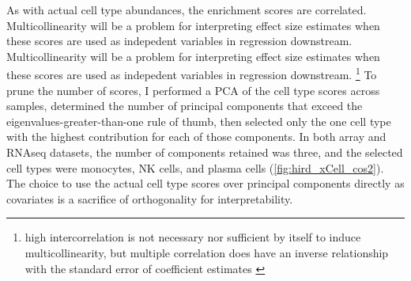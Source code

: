 As with actual cell type abundances, the enrichment scores are correlated.
Multicollinearity will be a problem for interpreting effect size estimates when these scores are used as indepedent variables in regression downstream.
Multicollinearity will be a problem for interpreting effect size estimates when these scores are used as indepedent variables in regression downstream.
\footnote{high intercorrelation is not necessary nor sufficient by itself to induce multicollinearity, but multiple correlation does have an inverse relationship with the standard error of coefficient estimates \autocite{maddala1992IntroductionEconometrics}}
To prune the number of scores, I performed a \gls{PCA} of the cell type scores across samples,
determined the number of principal components that exceed the eigenvalues-greater-than-one rule of thumb\autocite{kanyongo2005InfluenceReliabilityFour},
then selected only the one cell type with the highest contribution for each of those components.
In both array and \gls{RNAseq} datasets, the number of components retained was three, and the selected cell types were monocytes, \gls{NK} cells, and plasma cells (\cref{fig:hird_xCell_cos2}).
The choice to use the actual cell type scores over principal components directly as covariates is a sacrifice of orthogonality for interpretability.

